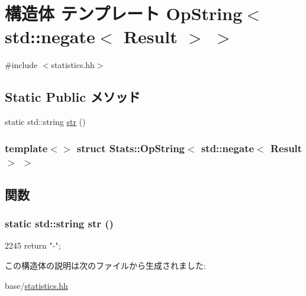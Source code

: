 \hypertarget{structStats_1_1OpString_3_01std_1_1negate_3_01Result_01_4_01_4}{
\section{構造体 テンプレート OpString$<$ std::negate$<$ Result $>$ $>$}
\label{structStats_1_1OpString_3_01std_1_1negate_3_01Result_01_4_01_4}
}


{\ttfamily \#include $<$statistics.hh$>$}\subsection*{Static Public メソッド}
\begin{DoxyCompactItemize}
\item 
static std::string \hyperlink{structStats_1_1OpString_3_01std_1_1negate_3_01Result_01_4_01_4_ac257b778f78be168137f5dc30893349b}{str} ()
\end{DoxyCompactItemize}
\subsubsection*{template$<$$>$ struct Stats::OpString$<$ std::negate$<$ Result $>$ $>$}



\subsection{関数}
\hypertarget{structStats_1_1OpString_3_01std_1_1negate_3_01Result_01_4_01_4_ac257b778f78be168137f5dc30893349b}{
\subsubsection[{str}]{\setlength{\rightskip}{0pt plus 5cm}static std::string str ()}}
\label{structStats_1_1OpString_3_01std_1_1negate_3_01Result_01_4_01_4_ac257b778f78be168137f5dc30893349b}



\begin{DoxyCode}
2245 { return "-"; }
\end{DoxyCode}


この構造体の説明は次のファイルから生成されました:\begin{DoxyCompactItemize}
\item 
base/\hyperlink{statistics_8hh}{statistics.hh}\end{DoxyCompactItemize}
